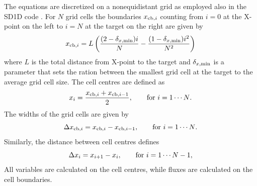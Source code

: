 \documentclass[amsmath,amssymb,a4]{revtex4-2}
\begin{document}
The equations are discretized on a nonequidistant grid as employed also in the SD1D code \cite{SD1D}. For  $N$ grid cells the boundaries $x_{{\rm cb},i}$ counting from $i = 0$ at the X-point on the left to $i =N$ at the target on the right are given by \cite{SD1D}
\begin{equation}\label{cell_boundaries}
   x_{{\rm cb},i} = L \left( {(2 - \delta_{x,{\rm min}}) i \over N} - {(1 - \delta_{x,{\rm min}}) i^2 \over N^2} \right)
\end{equation}
where $L$ is the total distance from X-point to the target and $\delta_{x,{\rm min}}$ is a parameter that sets the ration between the smallest grid cell at the target to the average grid cell size. The cell centres are defined as
\begin{equation}\label{cell_centres}
    x_i = {x_{{\rm cb},i} + x_{{\rm cb},i-1} \over 2}, \quad\quad\hbox{for $i = 1 \cdots N$}.
\end{equation}
The widths of the grid cells are given by
\begin{equation}\label{cell_width}
    \Delta x_{{\rm cb},i} = x_{{\rm cb},i} - x_{{\rm cb},i-1}, \quad\quad\hbox{for $i = 1 \cdots N$}.
\end{equation}
Similarly, the distance between cell centres defines
\begin{equation}\label{deltax}
    \Delta x_i = x_{i+1} - x_{i}, \quad\quad\hbox{for $i = 1 \cdots N-1$},
\end{equation}
All variables are calculated on the cell centres, while fluxes are calculated on the cell boundaries.
\end{document}
